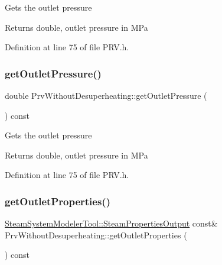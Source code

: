 Gets the outlet pressure

\begin{DoxyReturn}{Returns}
double, outlet pressure in M\+Pa 
\end{DoxyReturn}


Definition at line 75 of file P\+R\+V.\+h.

\mbox{\label{class_prv_without_desuperheating_ae1d335703442deec2f2c2f93e4c862f2}} 
\subsubsection{\texorpdfstring{get\+Outlet\+Pressure()}{getOutletPressure()}\hspace{0.1cm}{\footnotesize\ttfamily [3/3]}}
{\footnotesize\ttfamily double Prv\+Without\+Desuperheating\+::get\+Outlet\+Pressure (\begin{DoxyParamCaption}{ }\end{DoxyParamCaption}) const\hspace{0.3cm}{\ttfamily [inline]}}

Gets the outlet pressure

\begin{DoxyReturn}{Returns}
double, outlet pressure in M\+Pa 
\end{DoxyReturn}


Definition at line 75 of file P\+R\+V.\+h.

\mbox{\label{class_prv_without_desuperheating_afcf1f5d7e6b18643ac8adc9023578147}} 
\subsubsection{\texorpdfstring{get\+Outlet\+Properties()}{getOutletProperties()}\hspace{0.1cm}{\footnotesize\ttfamily [1/3]}}
{\footnotesize\ttfamily \hyperlink{struct_steam_system_modeler_tool_1_1_steam_properties_output}{Steam\+System\+Modeler\+Tool\+::\+Steam\+Properties\+Output} const\& Prv\+Without\+Desuperheating\+::get\+Outlet\+Properties (\begin{DoxyParamCaption}{ }\end{DoxyParamCaption}) const\hspace{0.3cm}{\ttfamily [inline]}}


